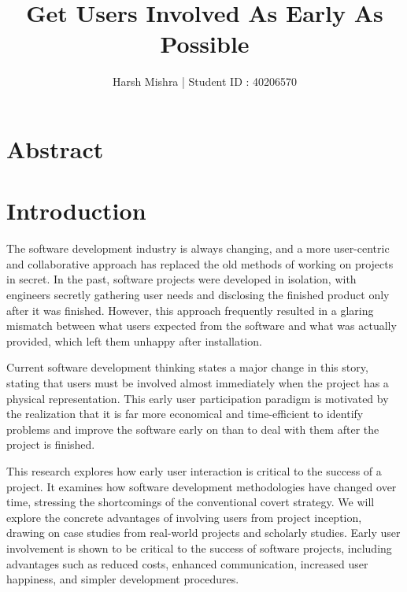 \documentclass[runningheads]{llncs}
\begin{document}
%
\title{Get Users Involved As Early As Possible}
%
%
\author{Harsh Mishra | Student ID : 40206570}
%

%

%
%
\maketitle

\tableofcontents

\newpage

\section{Abstract}


\section{Introduction}
The software development industry is always changing, and a more user-centric and collaborative approach has replaced the old methods of working on projects in secret. In the past, software projects were developed in isolation, with engineers secretly gathering user needs and disclosing the finished product only after it was finished. However, this approach frequently resulted in a glaring mismatch between what users expected from the software and what was actually provided, which left them unhappy after installation.

Current software development thinking states a major change in this story, stating that users must be involved almost immediately when the project has a physical representation. This early user participation paradigm is motivated by the realization that it is far more economical and time-efficient to identify problems and improve the software early on than to deal with them after the project is finished.

This research explores how early user interaction is critical to the success of a project. It examines how software development methodologies have changed over time, stressing the shortcomings of the conventional covert strategy. We will explore the concrete advantages of involving users from project inception, drawing on case studies from real-world projects and scholarly studies. Early user involvement is shown to be critical to the success of software projects, including advantages such as reduced costs, enhanced communication, increased user happiness, and simpler development procedures.
\end{document}
